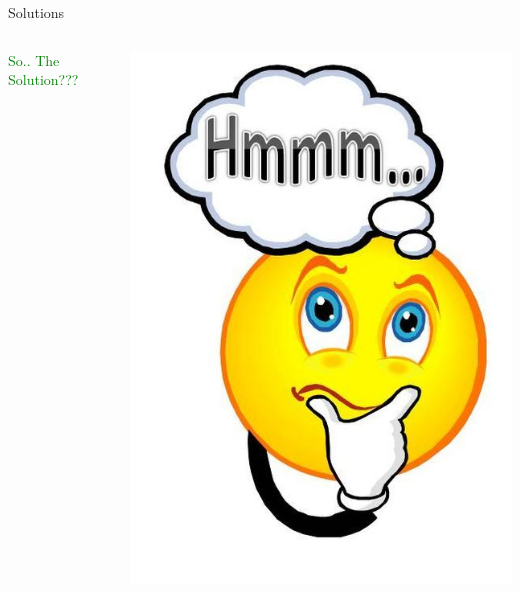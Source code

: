 \documentclass{beamer}
\begin{document}
\begin{frame}{Solutions}
   \begin{columns}
       \begin{column}{.5\textwidth}
            \centering
           \huge \textcolor{Green}{So.. The Solution???}
       \end{column}
       \begin{column}{.5\textwidth}
            \vfill
            
            \includegraphics[width=0.5\linewidth]{image/solution.jpg}
       \end{column}
   \end{columns}
\end{frame}
\end{document}
